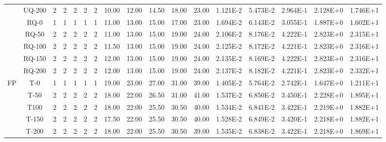 \begin{table}[ht]
\begin{center}
{\begin{tabular}{cc|c|c|c|c|c|c|c|c|c|c|c|c|c|c|c|}
\multicolumn{1}{|c|}{}                      & \multicolumn{1}{|c|}{UQ-200} &	2	&	2	&	2	&	2	&	2	&	10.00	&	12.00	&	14.50	&	18.00	&	23.00	&	1.121E-2	&	5.473E-2	&	2.964E-1	&	2.128E+0	&	1.746E+1	\\
\cline{2-17}																														
\multicolumn{1}{|c|}{}                      & \multicolumn{1}{|c|}{RQ-0} &	1	&	1	&	1	&	1	&	1	&	11.00	&	13.00	&	15.00	&	17.00	&	23.00	&	1.694E-2	&	6.143E-2	&	3.055E-1	&	1.887E+0	&	1.602E+1	\\
\multicolumn{1}{|c|}{}                      & \multicolumn{1}{|c|}{RQ-50} & 	2	&	2	&	2	&	2	&	2	&	11.00	&	13.00	&	15.00	&	19.00	&	24.00	&	2.106E-2	&	8.176E-2	&	4.222E-1	&	2.823E+0	&	2.315E+1	\\
\multicolumn{1}{|c|}{}                      & \multicolumn{1}{|c|}{RQ-100} &	2	&	2	&	2	&	2	&	2	&	11.50	&	13.00	&	15.00	&	19.00	&	24.00	&	2.125E-2	&	8.172E-2	&	4.221E-1	&	2.823E+0	&	2.316E+1	\\
\multicolumn{1}{|c|}{}                      & \multicolumn{1}{|c|}{RQ-150} &	2	&	2	&	2	&	2	&	2	&	12.00	&	13.00	&	15.00	&	19.00	&	24.00	&	2.135E-2	&	8.169E-2	&	4.222E-1	&	2.823E+0	&	2.316E+1	\\
\multicolumn{1}{|c|}{}                      & \multicolumn{1}{|c|}{RQ-200} & 	2	&	2	&	2	&	2	&	2	&	12.00	&	13.00	&	15.00	&	19.00	&	24.00	&	2.137E-2	&	8.182E-2	&	4.221E-1	&	2.823E+0	&	2.332E+1	\\
\cline{1-17}																														
\multicolumn{1}{|c|}{\multirow{15}{*}{FP}} & \multicolumn{1}{|c|}{T-0} & 	1	&	1	&	1	&	1	&	1	&	19.00	&	23.00	&	27.00	&	31.00	&	39.00	&	1.405E-2	&	5.764E-2	&	2.742E-1	&	1.647E+0	&	1.211E+1	\\
\multicolumn{1}{|c|}{}                      & \multicolumn{1}{|c|}{T-50} & 	2	&	2	&	2	&	2	&	2	&	18.00	&	22.00	&	26.50	&	31.00	&	41.00	&	1.537E-2	&	6.850E-2	&	3.450E-1	&	2.228E+0	&	1.895E+1	\\
\multicolumn{1}{|c|}{}                      & \multicolumn{1}{|c|}{T100} &	2	&	2	&	2	&	2	&	2	&	18.00	&	22.00	&	25.50	&	30.50	&	40.00	&	1.534E-2	&	6.841E-2	&	3.422E-1	&	2.219E+0	&	1.882E+1	\\
\multicolumn{1}{|c|}{}                      & \multicolumn{1}{|c|}{T-150} &	2	&	2	&	2	&	2	&	2	&	17.50	&	22.00	&	25.50	&	30.50	&	40.00	&	1.528E-2	&	6.849E-2	&	3.420E-1	&	2.218E+0	&	1.882E+1	\\
\multicolumn{1}{|c|}{}                      & \multicolumn{1}{|c|}{T-200} &	2	&	2	&	2	&	2	&	2	&	18.00	&	22.00	&	25.50	&	30.50	&	39.00	&	1.535E-2	&	6.838E-2	&	3.422E-1	&	2.218E+0	&	1.869E+1	\\

\end{tabular}}
\end{center}
\end{table}
